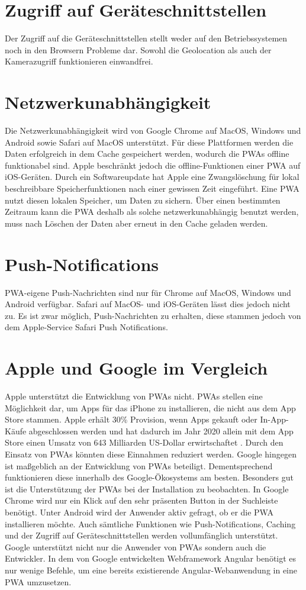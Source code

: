 \section{Zugriff auf Geräteschnittstellen}
Der Zugriff auf die Geräteschnittstellen stellt weder auf den Betriebssystemen noch in den Browsern Probleme dar. Sowohl die Geolocation als auch der Kamerazugriff funktionieren einwandfrei.

\section{Netzwerkunabhängigkeit}
Die Netzwerkunabhängigkeit wird von Google Chrome auf MacOS, Windows und Android sowie Safari auf MacOS unterstützt. Für diese Plattformen werden die Daten erfolgreich in dem Cache gespeichert werden, wodurch die PWAs offline funktionabel sind.
Apple beschränkt jedoch die offline-Funktionen einer PWA auf iOS-Geräten. Durch ein Softwareupdate hat Apple eine Zwangslöschung für lokal beschreibbare Speicherfunktionen nach einer gewissen Zeit eingeführt. Eine PWA nutzt diesen lokalen Speicher, um Daten zu sichern. Über einen bestimmten Zeitraum kann die PWA deshalb als solche netzwerkunabhängig benutzt werden, muss nach Löschen der Daten aber erneut in den Cache geladen werden.

\section{Push-Notifications}
PWA-eigene Push-Nachrichten sind nur für Chrome auf MacOS, Windows und Android verfügbar. Safari auf MacOS- und iOS-Geräten lässt dies jedoch nicht zu. Es ist zwar möglich, Push-Nachrichten zu erhalten, diese stammen jedoch von dem Apple-Service Safari Push Notifications. 

\section{Apple und Google im Vergleich}
Apple unterstützt die Entwicklung von PWAs nicht. PWAs stellen eine Möglichkeit dar, um Apps für das iPhone zu installieren, die nicht aus dem App Store stammen. Apple erhält 30\% Provision, wenn Apps gekauft oder In-App-Käufe abgeschlossen werden und hat dadurch im Jahr 2020 allein mit dem App Store einen Umsatz von 643 Milliarden US-Dollar erwirtschaftet \cite{Kirchenbauer2021}. Durch den Einsatz von PWAs könnten diese Einnahmen reduziert werden.
Google hingegen ist maßgeblich an der Entwicklung von PWAs beteiligt. Dementsprechend funktionieren diese innerhalb des Google-Ökosystems am besten. Besonders gut ist die Unterstützung der PWAs bei der Installation zu beobachten. In Google Chrome wird nur ein Klick auf den sehr präsenten Button in der Suchleiste benötigt. Unter Android wird der Anwender aktiv gefragt, ob er die PWA installieren möchte. Auch sämtliche Funktionen wie Push-Notifications, Caching und der Zugriff auf Geräteschnittstellen werden vollumfänglich unterstützt.
Google unterstützt nicht nur die Anwender von PWAs sondern auch die Entwickler. In dem von Google entwickelten Webframework Angular benötigt es nur wenige Befehle, um eine bereits existierende Angular-Webanwendung in eine PWA umzusetzen. 



